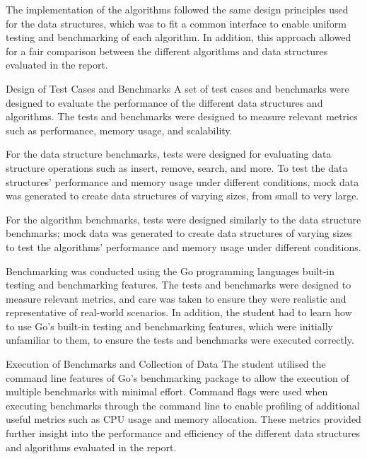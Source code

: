 \documentclass[a4paper,12pt]{article}
\makeatletter
\renewcommand{\subsection}{\needspace{.15\textheight} \@startsection{subsection}{1}{0mm}
  {\baselineskip}
  {\baselineskip}{\large\bfseries\scshape}}
\makeatother
\begin{document}
The implementation of the algorithms followed the same design principles used for the data structures, which was to fit a common interface to enable uniform testing and benchmarking of each algorithm. In addition, this approach allowed for a fair comparison between the different algorithms and data structures evaluated in the report.

\subsection{Design of Test Cases and Benchmarks}
A set of test cases and benchmarks were designed to evaluate the performance of the different data structures and algorithms. The tests and benchmarks were designed to measure relevant metrics such as performance, memory usage, and scalability.
\vspace{9pt}

For the data structure benchmarks, tests were designed for evaluating data structure operations such as insert, remove, search, and more. To test the data structures' performance and memory usage under different conditions, mock data was generated to create data structures of varying sizes, from small to very large.
\vspace{9pt}

For the algorithm benchmarks, tests were designed similarly to the data structure benchmarks; mock data was generated to create data structures of varying sizes to test the algorithms' performance and memory usage under different conditions.
\vspace{9pt}

Benchmarking was conducted using the Go programming languages built-in testing and benchmarking features. The tests and benchmarks were designed to measure relevant metrics, and care was taken to ensure they were realistic and representative of real-world scenarios.
In addition, the student had to learn how to use Go's built-in testing and benchmarking features, which were initially unfamiliar to them, to ensure the tests and benchmarks were executed correctly.

\subsection{Execution of Benchmarks and Collection of Data}
The student utilised the command line features of Go's benchmarking package to allow the execution of multiple benchmarks with minimal effort. Command flags were used when executing benchmarks through the command line to enable profiling of additional useful metrics such as CPU usage and memory allocation. These metrics provided further insight into the performance and efficiency of the different data structures and algorithms evaluated in the report.
\vspace{9pt}
\end{document}
